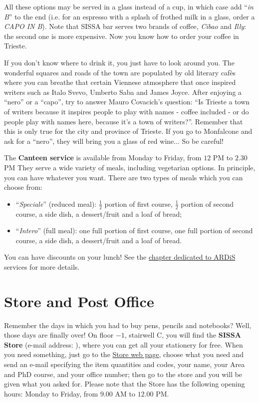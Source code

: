\documentclass{sissavademecum}
\begin{document}
All these options may be served in a glass instead of a cup, in which case add ``\textit{in B}{}'' to the end (i.e. for an espresso with a splash of frothed milk in a glass, order a \textit{CAPO IN B}). Note that SISSA bar serves two brands of coffee, \textit{Cibao} and \textit{Illy}: the second one is more expensive. Now you know how to order your coffee in Trieste. 

If you don't know where to drink it, you just have to look around you. The wonderful squares and roads of the town are populated by old literary caf\`es where you can breathe that certain Viennese atmosphere that once inspired writers such as Italo Svevo, Umberto Saba and James Joyce. After enjoying a ``nero'' or a ``capo'', try to answer Mauro Covacich's question: ``Is Trieste a town of writers because it inspires people to play with names - coffee included - or do people play with names here, because it's a town of writers?''. Remember that this is only true for the city and province of Trieste. If you go to Monfalcone and ask for a ``nero'', they will bring you a glass of red wine... So be careful!

The \textbf{Canteen service} is available from Monday to Friday, from $12$ PM to $2.30$ PM They serve a wide variety of meals, including vegetarian options. In principle, you can have whatever you want. There are two types of meals which you can choose from:

\begin{itemize}
    \item ``\textit{Speciale}'' (reduced meal): $\frac{1}{2}$ portion of first course, $\frac{1}{2}$ portion of second course, a side dish, a
    dessert/fruit and a loaf of bread;
    \item ``\textit{Intero}'' (full meal): one full portion of first course, one full portion of second course, a side
    dish, a dessert/fruit and a loaf of bread.
\end{itemize}

\noindent You can have discounts on your lunch! See the \hyperlink{ARDiS}{chapter dedicated to ARDiS} services for more details.


\section{Store and Post Office}
\label{sec:Store}

Remember the days in which you had to buy pens, pencils and notebooks? Well, those days are finally over! On floor $-1$, stairwell C, you will find the \textbf{SISSA Store} (e-mail address: ), where you can get all your stationery for free. When you need something, just go to the \href{http://services.sissa.it/store/}{Store web page}, choose what you need and send an e-mail specifying the item quantities and codes, your name, your Area and PhD course, and your office number; then go to the store and you will be given what you asked for. Please note that the Store has the following opening hours: Monday to Friday, from $9.00$ AM to $12.00$ PM.
\end{document}
